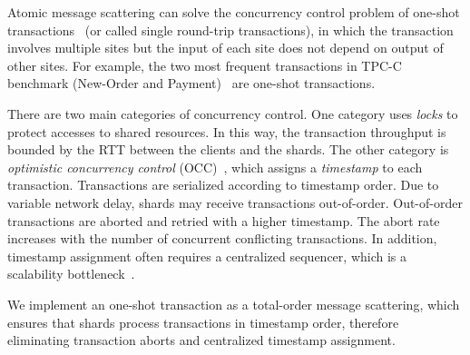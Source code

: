 Atomic message scattering can solve the concurrency control problem of one-shot transactions~\cite{kallman2008h} (or called single round-trip transactions), in which the transaction involves multiple sites but the input of each site does not depend on output of other sites. For example, the two most frequent transactions in TPC-C benchmark (New-Order and Payment)~\cite{tpcc} are one-shot transactions.

There are two main categories of concurrency control. One category uses \textit{locks} to protect accesses to shared resources. In this way, the transaction throughput is bounded by the RTT between the clients and the shards. The other category is \textit{optimistic concurrency control} (OCC)~\cite{kung1981optimistic,bernstein1983multiversion}, which assigns a \textit{timestamp} to each transaction. Transactions are serialized according to timestamp order. Due to variable network delay, shards may receive transactions out-of-order. Out-of-order transactions are aborted and retried with a higher timestamp. The abort rate increases with the number of concurrent conflicting transactions. In addition, timestamp assignment often requires a centralized sequencer, which is a scalability bottleneck~\cite{yu2014staring}.

We implement an one-shot transaction as a total-order message scattering, which ensures that shards process transactions in timestamp order, therefore eliminating transaction aborts and centralized timestamp assignment. %



